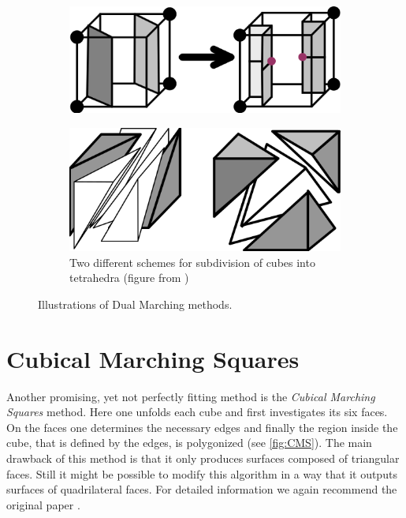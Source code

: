 \begin{figure}
\begin{center}
\begin{subfigure}[t]{.45\textwidth}
\begin{center}
\includegraphics[width = .8\textwidth]{Pictures/SurfaceReconstruction/MCtoDualMC.png}
\end{center}
\end{subfigure}
\hfill
\begin{subfigure}[t]{.45\textwidth}
\begin{center}
\includegraphics[width = .8\textwidth]{Pictures/SurfaceReconstruction/SplittingCubes.png}
\caption{Two different schemes for subdivision of cubes into tetrahedra (figure from \cite{Nielson2008})}
\label{fig:splittingCubes}
\end{center}
\end{subfigure}
\caption{Illustrations of Dual Marching methods.}
\end{center}
\end{figure}

\section{Cubical Marching Squares}
Another promising, yet not perfectly fitting method is the \emph{Cubical Marching Squares} method. Here one unfolds each cube and first investigates  its six faces. On the faces one determines the necessary edges and finally the region inside the cube, that is defined by the edges,  is polygonized (see \autoref{fig:CMS}). The main drawback of this method is that it only produces surfaces composed of triangular faces. Still it might be possible to modify this algorithm in a way that it outputs surfaces of quadrilateral faces. For detailed information we again recommend the original paper \cite{Ho2005}.

